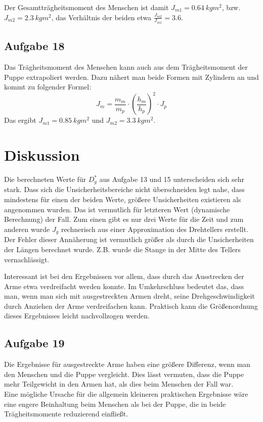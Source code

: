 \documentclass[a4paper, 11pt, ngerman]{scrartcl}
\begin{document}
Der Gesamtträgheitsmoment des Menschen ist damit $J_{m1} = \SI{0.64}{kgm^2}$, bzw. $J_{m2} = \SI{2.3}{kgm^2}$, das Verhältnis der beiden etwa $\frac{J_{m2}}{J_{m1}} = 3.6$.

\subsection{Aufgabe 18}
Das Trägheitsmoment des Menschen kann auch aus dem Trägheitsmoment der Puppe extrapoliert werden. Dazu nähert man beide Formen mit Zylindern an und kommt zu folgender Formel:
\begin{equation}
J_m = \frac{m_m}{m_p} \cdot \left(\frac{h_m}{h_p}\right)^2 \cdot J_p
\end{equation}
Das ergibt $J_{m1} = \SI{0.85}{kgm^2}$ und $J_{m2} = \SI{3.3}{kgm^2}$.

\section{Diskussion}
Die berechneten Werte für $D^*_g$ aus Aufgabe 13 und 15 unterscheiden sich sehr stark. Dass sich die Unsicherheitsbereiche nicht überschneiden legt nahe, dass mindestens für einen der beiden Werte, größere Unsicherheiten existieren als angenommen wurden. Das ist vermutlich für letzteren Wert (dynamische Berechnung) der Fall. Zum einen gibt es nur drei Werte für die Zeit und zum anderen wurde $J_g$ rechnerisch aus einer Approximation des Drehtellers erstellt. Der Fehler dieser Annäherung ist vermutlich größer als durch die Unsicherheiten der Längen berechnet wurde. Z.B. wurde die Stange in der Mitte des Tellers vernachlässigt.

Interessant ist bei den Ergebnissen vor allem, dass durch das Ausstrecken der Arme etwa verdreifacht werden konnte. Im Umkehrschluss bedeutet das, dass man, wenn man sich mit ausgestreckten Armen dreht, seine Drehgeschwindigkeit durch Anziehen der Arme verdreifachen kann. Praktisch kann die Größenordnung dieses Ergebnisses leicht nachvollzogen werden.

\subsection{Aufgabe 19}
Die Ergebnisse für ausgestreckte Arme haben eine größere Differenz, wenn man den Menschen und die Puppe vergleicht. Dies lässt vermuten, dass die Puppe mehr Teilgewicht in den Armen hat, als dies beim Menschen der Fall war.\\
Eine mögliche Ursache für die allgemein kleineren praktischen Ergebnisse wäre eine engere Beinhaltung beim Menschen als bei der Puppe, die in beide Trägheitsmomente reduzierend einfließt.
\end{document}
